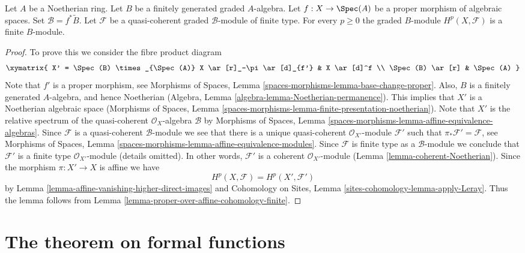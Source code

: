 \begin{lemma}
\label{lemma-graded-finiteness}
Let $A$ be a Noetherian ring.
Let $B$ be a finitely generated graded $A$-algebra.
Let $f : X \to \Spec(A)$ be a proper morphism of algebraic spaces.
Set $\mathcal{B} = f^*\widetilde B$.
Let $\mathcal{F}$ be a quasi-coherent
graded $\mathcal{B}$-module of finite type.
For every $p \geq 0$ the graded $B$-module $H^p(X, \mathcal{F})$
is a finite $B$-module.
\end{lemma}

\begin{proof}
To prove this we consider the fibre product diagram
$$
\xymatrix{
X' = \Spec(B) \times_{\Spec(A)} X
\ar[r]_-\pi \ar[d]_{f'} &
X \ar[d]^f \\
\Spec(B) \ar[r] &
\Spec(A)
}
$$
Note that $f'$ is a proper morphism, see
Morphisms of Spaces, Lemma \ref{spaces-morphisms-lemma-base-change-proper}.
Also, $B$ is a finitely generated $A$-algebra, and hence
Noetherian (Algebra, Lemma \ref{algebra-lemma-Noetherian-permanence}).
This implies that $X'$ is a Noetherian algebraic space
(Morphisms of Spaces, Lemma
\ref{spaces-morphisms-lemma-finite-presentation-noetherian}).
Note that $X'$ is the relative spectrum of the quasi-coherent
$\mathcal{O}_X$-algebra $\mathcal{B}$ by
Morphisms of Spaces, Lemma
\ref{spaces-morphisms-lemma-affine-equivalence-algebras}.
Since $\mathcal{F}$ is a quasi-coherent $\mathcal{B}$-module
we see that there is a unique quasi-coherent
$\mathcal{O}_{X'}$-module $\mathcal{F}'$ such that
$\pi_*\mathcal{F}' = \mathcal{F}$, see
Morphisms of Spaces, Lemma
\ref{spaces-morphisms-lemma-affine-equivalence-modules}.
Since $\mathcal{F}$ is finite type as a $\mathcal{B}$-module we
conclude that $\mathcal{F}'$ is a finite type
$\mathcal{O}_{X'}$-module (details omitted). In other words,
$\mathcal{F}'$ is a coherent $\mathcal{O}_{X'}$-module
(Lemma \ref{lemma-coherent-Noetherian}).
Since the morphism $\pi : X' \to X$ is affine we have
$$
H^p(X, \mathcal{F}) = H^p(X', \mathcal{F}')
$$
by
Lemma \ref{lemma-affine-vanishing-higher-direct-images}
and
Cohomology on Sites, Lemma \ref{sites-cohomology-lemma-apply-Leray}.
Thus the lemma follows from
Lemma \ref{lemma-proper-over-affine-cohomology-finite}.
\end{proof}




\section{The theorem on formal functions}
\label{section-theorem-formal-functions}

